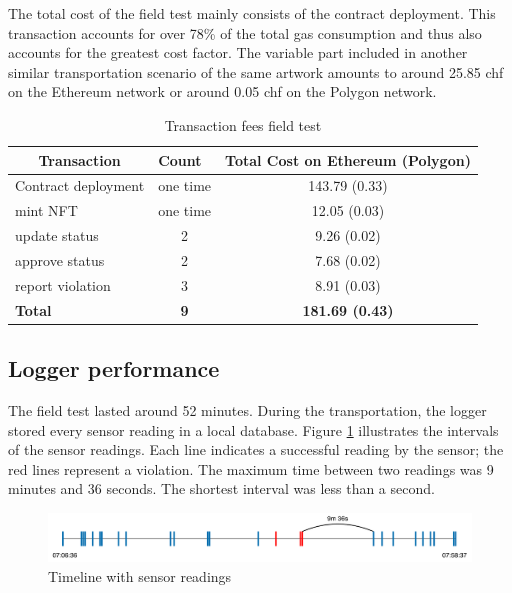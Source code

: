 The total cost of the field test mainly consists of the contract deployment. This transaction accounts for over 78\% of the total gas consumption and thus also accounts for the greatest cost factor. The variable part included in another similar transportation scenario of the same artwork amounts to around 25.85 \gls{chf} on the Ethereum network or around 0.05 \gls{chf} on the Polygon network.

\begin{table}[ht]
\centering
\begin{tabular}{lcc}
\multicolumn{1}{c}{\textbf{Transaction}} & \multicolumn{1}{l}{\textbf{Count}} & \multicolumn{1}{c}{\textbf{Total Cost on Ethereum (Polygon)}} \\ \hline
Contract deployment                      & one time                           & 143.79 (0.33)          \\
mint NFT                                 & one time                           & 12.05 (0.03)           \\
update status                            & 2                                  & 9.26 (0.02)            \\
approve status                           & 2                                  & 7.68 (0.02)            \\
report violation                         & 3                                  & 8.91 (0.03)            \\ \hline
\textbf{Total}                           & \textbf{9}                         & \textbf{181.69 (0.43)} \\
\hline
\end{tabular}
\caption{Transaction fees field test}
\label{tab:field_test_tx_fees}
\end{table}


\subsection{Logger performance}
The field test lasted around 52 minutes. During the transportation, the logger stored every sensor reading in a local database. Figure \ref{fig:field_test_sensor_readings} illustrates the intervals of the sensor readings. Each line indicates a successful reading by the sensor; the red lines represent a violation. The maximum time between two readings was 9 minutes and 36 seconds. The shortest interval was less than a second.

\begin{figure}[ht]
    \centering
    \includegraphics[width=\textwidth]{diagrams/sensor_eval.drawio.pdf}
    \caption{Timeline with sensor readings}
    \label{fig:field_test_sensor_readings}
\end{figure}

